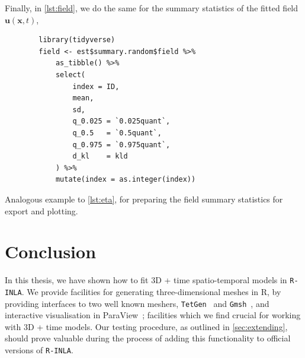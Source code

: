 \documentclass[british]{scrreprt}
\begin{document}
Finally, in \cref{lst:field}, we do the same for the summary statistics of the fitted field \( \symbf{u}(\symbf{x}, t) \),
\begin{listing}
    \begin{verbatim}
        library(tidyverse)
        field <- est$summary.random$field %>%
        	as_tibble() %>%
        	select(
        		index = ID,
        		mean,
        		sd,
        		q_0.025 = `0.025quant`,
        		q_0.5   = `0.5quant`,
        		q_0.975 = `0.975quant`,
        		d_kl    = kld
        	) %>%
        	mutate(index = as.integer(index))
    \end{verbatim}
    \caption{Analogous example to \cref{lst:eta}, for preparing the field summary statistics for export and plotting.}
    \label{lst:field}
\end{listing}

\chapter{Conclusion}
\label{ch:conclusion}
In this thesis, we have shown how to fit 3D + time spatio-temporal models in \texttt{R-INLA}. We provide facilities for generating three-dimensional meshes in R, by providing interfaces to two well known meshers, \texttt{TetGen}~\cite{SiTetGenDelaunayBasedQuality2015} and \texttt{Gmsh}~\cite{GeuzaineGmsh3Dfinite2009}, and interactive visualisation in ParaView~\cite{ParaView}; facilities which we find crucial for working with 3D + time models. Our testing procedure, as outlined in \cref{sec:extending}, should prove valuable during the process of adding this functionality to official versions of \texttt{R-INLA}.
\end{document}
